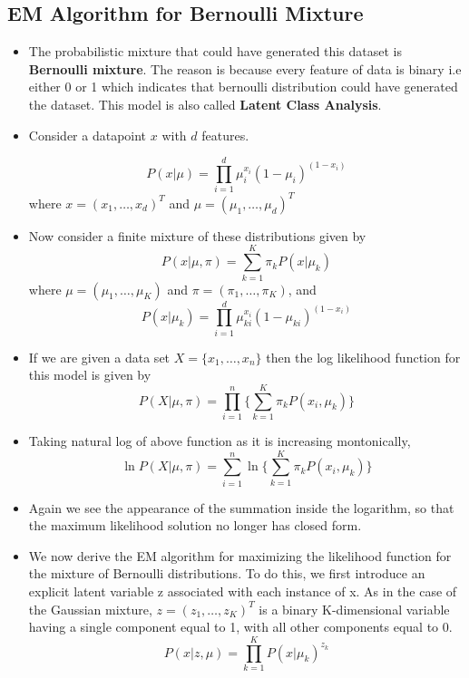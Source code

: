 \documentclass[12pt, a4paper]{article}
\begin{document}
\subsection{EM Algorithm for Bernoulli Mixture}
\begin{itemize}
    \item \large The probabilistic mixture that could have generated this dataset is \textbf{Bernoulli mixture}. The reason is because every feature of data is binary i.e either 0 or 1 which indicates that bernoulli distribution could have generated the dataset. This model is also called \textbf{Latent Class Analysis}.
    \item \large Consider a datapoint $x$ with $d$ features.
    
    \[P(x|\mu)=\prod\limits_{i=1}^{d}\mu_i^{x_i}(1-\mu_i)^{(1-x_i)}\]
    where $x=(x_1,\dots,x_d)^T$ and $\mu=(\mu_1,\dots,\mu_d)^T$

    \item \large Now consider a finite mixture of these distributions given by
    \[P(x|\mu,\pi)=\sum\limits_{k=1}^{K}\pi_kP(x|\mu_k)\]
    where $\mu=(\mu_1,\dots,\mu_K)$ and $\pi=(\pi_1,\dots,\pi_K)$, and
    \[P(x|\mu_k)=\prod\limits_{i=1}^{d}\mu_{ki}^{x_i}(1-\mu_{ki})^{(1-x_i)}\]

    \item \large If we are given a data set $X=\{x_1,\dots,x_n\}$ then the log likelihood function for this model is given by
    \[ P(X|\mu,\pi)=\prod\limits_{i=1}^{n} \{\sum\limits_{k=1}^{K}\pi_kP(x_i,\mu_k)\} \]

    \item \large Taking natural log of above function as it is increasing montonically,
    \[\ln P(X|\mu,\pi)=\sum\limits_{i=1}^{n}\ln \{\sum\limits_{k=1}^{K}\pi_kP(x_i,\mu_k)\} \]

    \item \textbf{} Again we see the appearance of the summation inside the logarithm, so that the maximum likelihood solution no longer has closed form.
    \item We now derive the EM algorithm for maximizing the likelihood function for the mixture of Bernoulli distributions. To do this, we first introduce an explicit latent variable z associated with each instance of x. As in the case of the Gaussian mixture, $z = (z_1,\dots,z_K)^T$ is a binary K-dimensional variable having a single component equal to 1, with all other components equal to 0.
    \[P(x|z,\mu)=\prod\limits_{k=1}^{K}P(x|\mu_k)^{z_k}\]


\end{itemize}
\end{document}
